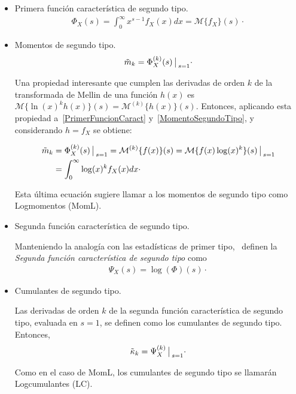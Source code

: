 \begin{itemize}
\item Primera función característica de segundo tipo.
	\begin{align}
	\Phi_X(s)=\int_{0}^{\infty} x^{s-1} f_X(x) dx = \mathcal{M}\{f_X\}(s)\cdot
	\label{PrimerFuncionCaract}
	\end{align}
\item Momentos de segundo tipo.
	\begin{align}
	\label{MomentoSegundoTipo}
	\tilde{m}_k=\Phi_X^{(k)}(s) \big\arrowvert _{s=1}\cdot
	\end{align}


	Una propiedad interesante que cumplen las derivadas de orden $k$ de la transformada de Mellin de una función $h(x)$ es $\mathcal{M}\{\ln(x)^k h(x)\}(s)=\mathcal{M}^{(k)}\{h(x)\}(s)$. Entonces, aplicando esta propiedad a~\eqref{PrimerFuncionCaract} y~\eqref{MomentoSegundoTipo}, y considerando $h=f_X$ se obtiene:

	\begin{align}
	\label{MomL}
	\nonumber \tilde{m}_k&=\Phi_X^{(k)}(s) \big\arrowvert _{s=1} =\mathcal{M}^{(k)}\{f(x)\}(s) =\mathcal{M}\{f(x) \log(x)^k\}(s)\big\arrowvert _{s=1}          \\
 	        &=\int_{0}^{\infty} \log(x)^k f_X(x) dx \cdot
	\end{align}

	Esta última ecuación sugiere llamar a los momentos de segundo tipo como Logmomentos (MomL).
	
\item Segunda función característica de segundo tipo.

      Manteniendo la analogía con las estadísticas de primer tipo,~\citet{nicolas2002} definen la \textit{Segunda función característica de segundo tipo} como
      \begin{align}
      \label{Sgunda Psi}
      \Psi_X(s)=\log(\Phi)(s)\cdot
      \end{align}
      
\item Cumulantes de segundo tipo.

	  Las derivadas de orden $k$ de la segunda función característica de segundo tipo, evaluada en $s=1$, se definen como los cumulantes de segundo tipo. Entonces,
	  \begin{align}
	  \label{CumulanteSegundoTipo}
	  \tilde{\kappa}_k=\Psi_X^{(k)}\big\arrowvert _{s=1}\cdot
	  \end{align}
	  
Como en el caso de MomL, los cumulantes de segundo tipo se llamarán Logcumulantes (LC).
\end{itemize}

